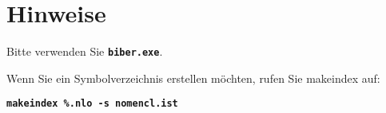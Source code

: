%
%
%



\chapter{Hinweise}

Bitte verwenden Sie  \textbf{\texttt{biber.exe}}.

\bigskip

Wenn Sie ein Symbolverzeichnis erstellen möchten, rufen Sie makeindex auf:


\textbf{\texttt{makeindex \%.nlo -s nomencl.ist}}
